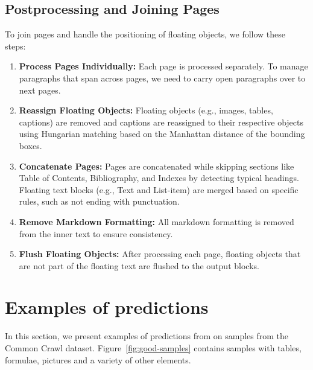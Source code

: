 \subsection{Postprocessing and Joining Pages}
To join pages and handle the positioning of floating objects, we follow these steps:

\begin{enumerate}
    \item \textbf{Process Pages Individually:} Each page is processed separately. To manage paragraphs that span across pages, we need to carry open paragraphs over to next pages.
    \item \textbf{Reassign Floating Objects:} Floating objects (e.g., images, tables, captions) are removed and captions are reassigned to their respective objects using Hungarian matching based on the Manhattan distance of the bounding boxes.
    \item \textbf{Concatenate Pages:} Pages are concatenated while skipping sections like Table of Contents, Bibliography, and Indexes by detecting typical headings. Floating text blocks (e.g., Text and List-item) are merged based on specific rules, such as not ending with punctuation.
    \item \textbf{Remove Markdown Formatting:} All markdown formatting is removed from the inner text to ensure consistency.
    \item \textbf{Flush Floating Objects:} After processing each page, floating objects that are not part of the floating text are flushed to the output blocks.
\end{enumerate}

\section{Examples of predictions}

In this section, we present examples of predictions from \eclair on samples from the Common Crawl dataset. Figure~\ref{fig:good-samples} contains samples with tables, formulae, pictures and a variety of other elements. 

